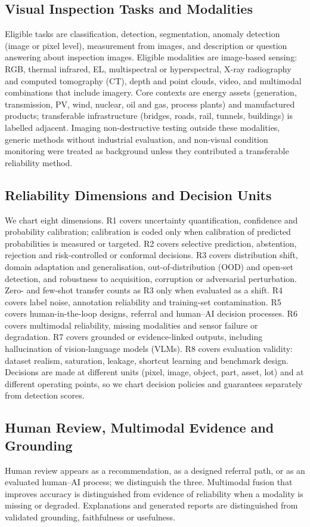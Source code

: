 \documentclass[journal]{IEEEtran}
\begin{document}
\subsection{Visual Inspection Tasks and Modalities}
Eligible tasks are classification, detection, segmentation, anomaly detection (image or pixel level), measurement from images, and description or question answering about inspection images. Eligible modalities are image-based sensing: RGB, thermal infrared, EL, multispectral or hyperspectral, X-ray radiography and computed tomography (CT), depth and point clouds, video, and multimodal combinations that include imagery. Core contexts are energy assets (generation, transmission, PV, wind, nuclear, oil and gas, process plants) and manufactured products; transferable infrastructure (bridges, roads, rail, tunnels, buildings) is labelled adjacent. Imaging non-destructive testing outside these modalities, generic methods without industrial evaluation, and non-visual condition monitoring were treated as background unless they contributed a transferable reliability method.

\subsection{Reliability Dimensions and Decision Units}
We chart eight dimensions. R1 covers uncertainty quantification, confidence and probability calibration; calibration is coded only when calibration of predicted probabilities is measured or targeted. R2 covers selective prediction, abstention, rejection and risk-controlled or conformal decisions. R3 covers distribution shift, domain adaptation and generalisation, out-of-distribution (OOD) and open-set detection, and robustness to acquisition, corruption or adversarial perturbation. Zero- and few-shot transfer counts as R3 only when evaluated as a shift. R4 covers label noise, annotation reliability and training-set contamination. R5 covers human-in-the-loop designs, referral and human--AI decision processes. R6 covers multimodal reliability, missing modalities and sensor failure or degradation. R7 covers grounded or evidence-linked outputs, including hallucination of vision-language models (VLMs). R8 covers evaluation validity: dataset realism, saturation, leakage, shortcut learning and benchmark design. Decisions are made at different units (pixel, image, object, part, asset, lot) and at different operating points, so we chart decision policies and guarantees separately from detection scores.

\subsection{Human Review, Multimodal Evidence and Grounding}
Human review appears as a recommendation, as a designed referral path, or as an evaluated human--AI process; we distinguish the three. Multimodal fusion that improves accuracy is distinguished from evidence of reliability when a modality is missing or degraded. Explanations and generated reports are distinguished from validated grounding, faithfulness or usefulness.
\end{document}
